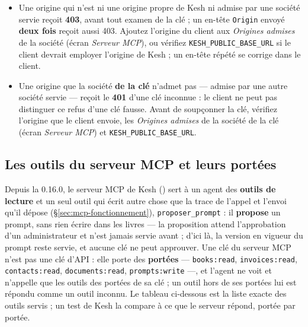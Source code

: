 \documentclass[a4paper,11pt,oneside]{article}
\begin{document}
\begin{itemize}
    \item Une origine qui n'est ni une origine propre de Kesh ni admise par une société servie reçoit \textbf{403}, avant tout examen de la clé ; un en-tête \texttt{Origin} envoyé \textbf{deux fois} reçoit aussi 403. Ajoutez l'origine du client aux \emph{Origines admises} de la société (écran \emph{Serveur MCP}), ou vérifiez \texttt{KESH\_PUBLIC\_BASE\_URL} si le client devrait employer l'origine de Kesh ; un en-tête répété se corrige dans le client.
    \item Une origine que la société \textbf{de la clé} n'admet pas --- admise par une autre société servie --- reçoit le \textbf{401} d'une clé inconnue : le client ne peut pas distinguer ce refus d'une clé fausse. Avant de soupçonner la clé, vérifiez l'origine que le client envoie, les \emph{Origines admises} de la société de la clé (écran \emph{Serveur MCP}) et \texttt{KESH\_PUBLIC\_BASE\_URL}.
\end{itemize}

\subsection{Les outils du serveur MCP et leurs portées}\label{sec:mcp-outils}

Depuis la 0.16.0, le serveur MCP de Kesh () sert à un agent des \textbf{outils de lecture} et un seul outil qui écrit autre chose que la trace de l'appel et l'envoi qu'il dépose (\S\ref{sec:mcp-fonctionnement}), \texttt{proposer\_prompt} : il \textbf{propose} un prompt, sans rien écrire dans les livres --- la proposition attend l'approbation d'un administrateur et n'est jamais servie avant ; d'ici là, la version en vigueur du prompt reste servie, et aucune clé ne peut approuver. Une clé du serveur MCP n'est pas une clé d'API : elle porte des \textbf{portées} --- \texttt{books:read}, \texttt{invoices:read}, \texttt{contacts:read}, \texttt{documents:read}, \texttt{prompts:write} ---, et l'agent ne voit et n'appelle que les outils des portées de sa clé ; un outil hors de ses portées lui est répondu comme un outil inconnu. Le tableau ci-dessous est la liste exacte des outils servis ; un test de Kesh la compare à ce que le serveur répond, portée par portée.
\end{document}
